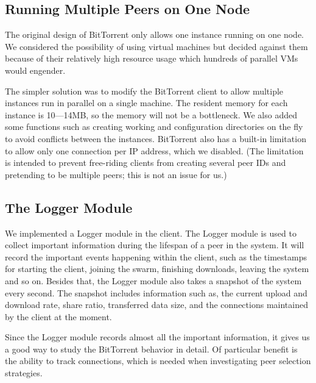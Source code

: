 \documentclass[10pt,letterpaper,twocolumn]{article}
\begin{document}
\subsection{Running Multiple Peers on One Node}
\label{sec:runn-mult-peers}



The original design of BitTorrent only allows one instance running on
one node. We considered the possibility of using virtual machines but
decided against them because of their relatively high resource usage
which hundreds of parallel VMs would engender.





The simpler solution was to modify the BitTorrent client to allow
multiple instances run in parallel on a single machine. The resident
memory for each instance is 10---14MB, so the memory will not be a
bottleneck. We also added some functions such as creating working and
configuration directories on the fly to avoid conflicts between the
instances. BitTorrent also has a built-in limitation to allow only one
connection per IP address, which we disabled. (The limitation is
intended to prevent free-riding clients from creating several peer IDs
and pretending to be multiple peers; this is not an issue for us.)








\subsection{The Logger Module}
\label{sec:logger-module}

We implemented a Logger module in the client. The Logger module is
used to collect important information during the lifespan of a peer in
the system. It will record the important events happening within the
client, such as the timestamps for starting the client, joining the
swarm, finishing downloads, leaving the system and so on. Besides
that, the Logger module also takes a snapshot of the system every
second. The snapshot includes information such as, the current upload
and download rate, share ratio, transferred data size, and the
connections maintained by the client at the moment.

Since the Logger module records almost all the important information,
it gives us a good way to study the BitTorrent behavior in
detail. Of particular benefit is the ability to track connections,
which is needed when investigating peer selection strategies.
\end{document}
